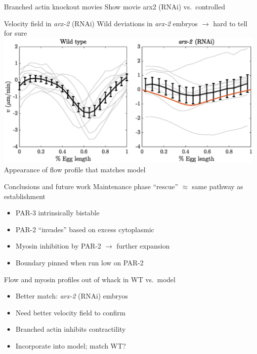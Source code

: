 \documentclass{beamer}
\newcommand{\6}[1]{#1_{\text{6}}}
\newcommand{\3}[1]{#1_{\text{3}}}
\begin{document}
\begin{frame}{Branched actin knockout movies}
Show movie arx2 (RNAi) vs.\ controlled
\end{frame}


\begin{frame}{Velocity field in \emph{arx-2} (RNAi)}
Wild deviations in \emph{arx-2} embryos $\rightarrow$ hard to tell for sure
\includegraphics[width=\textwidth]{FlowProfilesWTArx2WMod.eps}
Appearance of flow profile that matches model
\end{frame}

\begin{frame}{Conclusions and future work}
Maintenance phase ``rescue'' $\approx$ same pathway as establishment
\begin{itemize}
\item PAR-3 intrinsically bistable
\item PAR-2 ``invades'' based on excess cytoplasmic
\item Myosin inhibition by PAR-2 $\rightarrow$ further expansion
\item Boundary pinned when run low on PAR-2
\end{itemize}
Flow and myosin profiles out of whack in WT vs.\ model
\begin{itemize}
\item Better match: \emph{arx-2} (RNAi) embryos 
\item Need better velocity field to confirm
\item Branched actin inhibits contractility
\item Incorporate into model; match WT?
\end{itemize} 
\end{frame}
\end{document}
